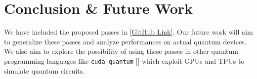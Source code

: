 \documentclass[10pt]{article}
\begin{document}
\section{Conclusion \& Future Work}
We have included the proposed passes in [\href{https://github.com/kst164/CS5863-IPACO-Final-Project}{GitHub Link}]. Our future work will aim to generalize these passes and analyze performances on actual quantum devices. We also aim to explore the possibility of using these passes in other quantum programming languages like \texttt{cuda-quantum} [\cite{cudaq}] which exploit GPUs and TPUs to simulate quantum circuits.

\newpage

{}
\end{document}
